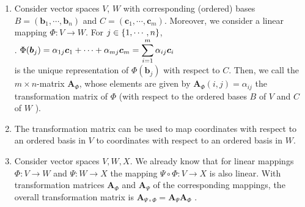 \begin{enumerate}
    \item
    \begin{definition}
        Consider vector spaces $V$, $W$ with corresponding (ordered) bases $B = (\bm{b}_1, \cdots , \bm{b}_n)$ and $C = (\bm{c}_1, \cdots , \bm{c}_m)$.
        Moreover, we consider a linear mapping $\Phi : V \to W$.
        For $j \in \left\{1, \cdots , n\right\}$,
        \hfill \cite{mfml/book/mml/Deisenroth-Faisal-Ong}
        \\
        .\hfill
        $
            \Phi(\bm{b}_j ) = \alpha _{1j} \bm{c}_1 + \cdots + \alpha _{mj} \bm{c}_m
            = \displaystyle\sum^m_{i=1} \alpha _{ij} \bm{c}_i
        $
        \hfill \cite{mfml/book/mml/Deisenroth-Faisal-Ong}
        \\
        is the unique representation of $\Phi(\bm{b}_j )$ with respect to $C$.
        Then, we call the $m \times n$-matrix $\bm{A}_\Phi$, whose elements are given by $\bm{A}_\Phi(i, j) = \alpha_{ij}$ the transformation matrix of $\Phi$ (with respect to the ordered bases $B$ of $V$ and $C$ of $W$  ).
        \hfill \cite{mfml/book/mml/Deisenroth-Faisal-Ong}
    \end{definition}

    \item The transformation matrix can be used to map coordinates with respect to an ordered basis in $V$ to coordinates with respect to an ordered basis in $W$.
    \hfill \cite{mfml/book/mml/Deisenroth-Faisal-Ong}

    \item Consider vector spaces $V, W, X$.
    We already know that for linear mappings $\Phi  : V \to  W$ and $\Psi : W \to  X$ the mapping $\Psi \circ \Phi  : V \to  X$ is also linear.
    With transformation matrices $\bm{A}_\Phi$  and $\bm{A}_\Psi$ of the corresponding mappings, the overall transformation matrix is $\bm{A}_{\Psi\circ\Phi}  = \bm{A}_\Psi \bm{A}_\Phi$ .
    \hfill \cite{mfml/book/mml/Deisenroth-Faisal-Ong}


\end{enumerate}
